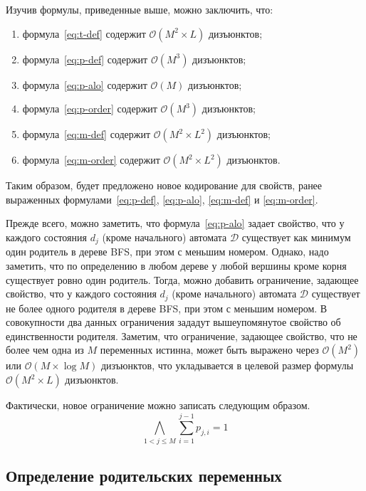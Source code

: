 Изучив формулы, приведенные выше, можно заключить, что:
\begin{enumerate}
  \item формула~\eqref{eq:t-def} содержит $\mathcal{O}\left(M^{2} \times L\right)$ дизъюнктов;
  \item формула~\eqref{eq:p-def} содержит $\mathcal{O}\left(M^{3}\right)$ дизъюнктов;
  \item формула~\eqref{eq:p-alo} содержит $\mathcal{O}\left(M\right)$ дизъюнктов;
  \item формула~\eqref{eq:p-order} содержит $\mathcal{O}\left(M^{3}\right)$ дизъюнктов;
  \item формула~\eqref{eq:m-def} содержит $\mathcal{O}\left(M^{2} \times L^{2}\right)$ дизъюнктов;
  \item формула~\eqref{eq:m-order} содержит $\mathcal{O}\left(M^{2} \times L^{2}\right)$ дизъюнктов.
\end{enumerate}
%
Таким образом, будет предложено новое кодирование для свойств, ранее выраженных формулами~\eqref{eq:p-def}, \eqref{eq:p-alo}, \eqref{eq:m-def} и \eqref{eq:m-order}.

Прежде всего, можно заметить, что формула~\eqref{eq:p-alo} задает свойство, что у каждого состояния $d_{j}$ (кроме начального) автомата $\mathcal{D}$ существует как минимум один родитель в дереве BFS, при этом с меньшим номером.
Однако, надо заметить, что по определению в любом дереве у любой вершины кроме корня существует ровно один родитель.
Тогда, можно добавить ограничение, задающее свойство, что у каждого состояния $d_{j}$ (кроме начального) автомата $\mathcal{D}$ существует не более одного родителя в дереве BFS, при этом с меньшим номером.
В совокупности два данных ограничения зададут вышеупомянутое свойство об единственности родителя.
Заметим, что ограничение, задающее свойство, что не более чем одна из $M$ переменных истинна, может быть выражено через $\mathcal{O}\left(M^2\right)$ или $\mathcal{O}\left(M\times \log M\right)$ дизъюнктов, что укладывается в целевой размер формулы $\mathcal{O}\left(M^{2} \times L\right)$ дизъюнктов.

Фактически, новое ограничение можно записать следующим образом.
\begin{equation}
\label{eq:p-sum-eq-one}
  \bigwedge_{1 < j \leq M} \sum_{i=1}^{j-1}p_{j,i}=1
\end{equation}


\subsection{Определение родительских переменных}
\label{sec:space:tight:p-def}

